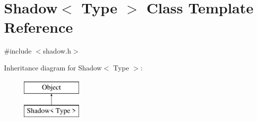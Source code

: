 \hypertarget{classShadow}{}\section{Shadow$<$ Type $>$ Class Template Reference}
\label{classShadow}


{\ttfamily \#include $<$shadow.\+h$>$}

Inheritance diagram for Shadow$<$ Type $>$\+:\begin{figure}[H]
\begin{center}
\leavevmode
\includegraphics[height=2.000000cm]{classShadow}
\end{center}
\end{figure}
